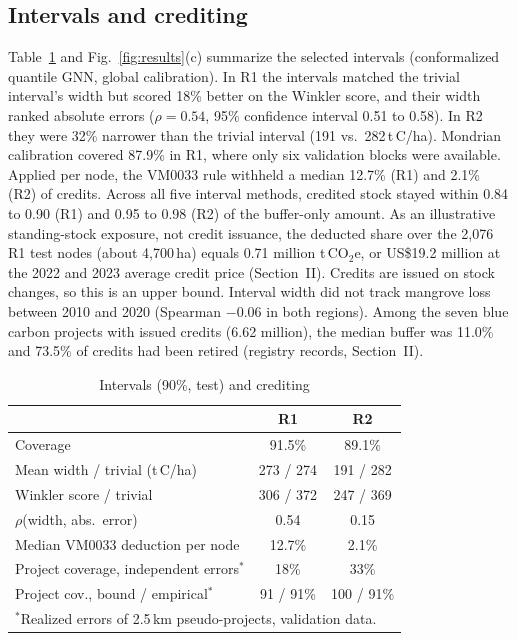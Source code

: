 \documentclass[conference]{IEEEtran}
\begin{document}
\subsection{Intervals and crediting}
Table~\ref{tab:uq} and Fig.~\ref{fig:results}(c) summarize the selected intervals (conformalized quantile GNN, global calibration).
In R1 the intervals matched the trivial interval's width but scored 18\% better on the Winkler score, and their width ranked absolute errors ($\rho=0.54$, 95\% confidence interval 0.51 to 0.58).
In R2 they were 32\% narrower than the trivial interval (191 vs.\ 282\,t\,C/ha).
Mondrian calibration covered 87.9\% in R1, where only six validation blocks were available.
Applied per node, the VM0033 rule withheld a median 12.7\% (R1) and 2.1\% (R2) of credits.
Across all five interval methods, credited stock stayed within 0.84 to 0.90 (R1) and 0.95 to 0.98 (R2) of the buffer-only amount.
As an illustrative standing-stock exposure, not credit issuance, the deducted share over the 2,076 R1 test nodes (about 4,700\,ha) equals 0.71 million t\,CO$_2$e, or US\$19.2 million at the 2022 and 2023 average credit price (Section~II).
Credits are issued on stock changes, so this is an upper bound.
Interval width did not track mangrove loss between 2010 and 2020 (Spearman $-0.06$ in both regions).
Among the seven blue carbon projects with issued credits (6.62 million), the median buffer was 11.0\% and 73.5\% of credits had been retired (registry records, Section~II).

\begin{table}[t]
\caption{Intervals (90\%, test) and crediting}
\centering
\begin{tabular}{lcc}
\toprule
 & R1 & R2 \\
\midrule
Coverage & 91.5\% & 89.1\% \\
Mean width / trivial (t\,C/ha) & 273 / 274 & 191 / 282 \\
Winkler score / trivial & 306 / 372 & 247 / 369 \\
$\rho$(width, abs.\ error) & 0.54 & 0.15 \\
Median VM0033 deduction per node & 12.7\% & 2.1\% \\
Project coverage, independent errors$^*$ & 18\% & 33\% \\
Project cov., bound / empirical$^*$ & 91 / 91\% & 100 / 91\% \\
\bottomrule
\multicolumn{3}{l}{\footnotesize $^*$Realized errors of 2.5\,km pseudo-projects, validation data.}
\end{tabular}
\label{tab:uq}
\end{table}
\end{document}
